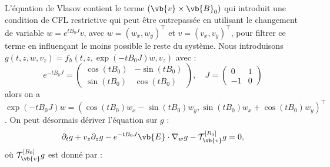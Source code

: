 L'équation de Vlasov contient le terme $(\vb{v}\times\vb{B}_0)$ qui introduit une condition de CFL restrictive qui peut être outrepassée en utilisant le changement de variable $w=e^{tB_0J}v$, avec $w=(w_x,w_y)^\top$ et $v=(v_x,v_y)^\top$, pour filtrer ce terme en influençant le moins possible le reste du système. Nous introduisons $g(t,z,w,v_z) = f_h(t,z,\exp(-tB_0J)w,v_z)$ avec :
$$
  e^{-tB_0J} = \begin{pmatrix}
    \cos(tB_0) & -\sin(tB_0) \\
    \sin(tB_0) &  \cos(tB_0)
  \end{pmatrix},
  \quad
  J = \begin{pmatrix}
    0  & 1 \\
    -1 & 0
  \end{pmatrix}
$$
alors on a $\exp(-tB_0J)w = \left( \cos(tB_0)w_x - \sin(tB_0)w_y , \sin(tB_0)w_x + \cos(tB_0)w_y \right)^\top$. On peut désormais dériver l'équation sur $g$ :
\begin{equation}
  \partial_t g + v_z\partial_z g - e^{-tB_0J}\vb{E}\cdot\nabla_w g - \mathcal{T}_{\vb{v}}^{[B_0]}g = 0,
\end{equation}
où $\mathcal{T}_{\vb{v}}^{[B_0]}g$ est donné par :
